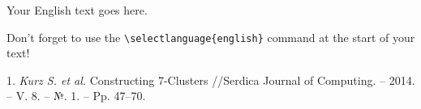 \documentclass{vzmsthesis}
\begin{document}



\vzmscaption

Your English text goes here.

Don't forget to use the
\verb`\selectlanguage{english}`
command at the start of your text!

\litlist


1. {\it Kurz S. et al.} Constructing 7-Clusters //Serdica Journal of Computing. – 2014. – V. 8. – №. 1. – Pp. 47–70.
\end{document}
